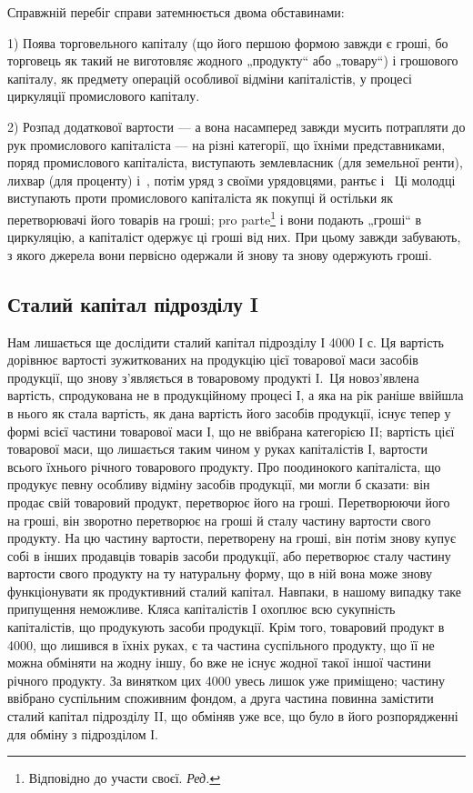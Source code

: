 
Справжній перебіг справи затемнюється двома обставинами:

1) Поява торговельного капіталу (що його першою формою
завжди є гроші, бо торговець як такий не виготовляє жодного
„продукту“ або „товару“) і грошового капіталу, як предмету
операцій особливої відміни капіталістів, у процесі циркуляції промислового
капіталу.

2) Розпад додаткової вартости — а вона насамперед завжди мусить
потрапляти до рук промислового капіталіста — на різні категорії, що їхніми
представниками, поряд промислового капіталіста, виступають землевласник
(для земельної ренти), лихвар (для проценту) і~, потім уряд з своїми
урядовцями, рантьє і~ Ці молодці виступають проти промислового
капіталіста як покупці й остільки як перетворювачі його товарів на гроші;
pro parte\footnote*{
Відповідно до участи своєї. \emph{Ред.}
} і вони подають „гроші“ в циркуляцію, а капіталіст одержує
ці гроші від них. При цьому завжди забувають, з якого джерела вони
первісно одержали й знову та знову одержують гроші.
\label{original-325-1}

\subsection[Сталий капітал підрозділу I]{Сталий капітал підрозділу I\footnotemark{}}

\label{original-325-2}
\noindent{}Нам лишається ще дослідити сталий капітал підрозділу І \deq{} 4000 І с.
Ця вартість дорівнює вартості зужиткованих на продукцію цієї товарової
маси засобів продукції, що знову з’являється в товаровому продукті І.~Ця новоз’явлена вартість, спродукована не в продукційному процесі І, а
яка на рік раніше ввійшла в нього як стала вартість, як дана вартість
його засобів продукції, існує тепер у формі всієї частини товарової маси І,
що не ввібрана категорією II; вартість цієї товарової маси, що лишається
таким чином у руках капіталістів І, \deq{}  вартости всього їхнього річного
товарового продукту. Про поодинокого капіталіста, що продукує певну
особливу відміну засобів продукції, ми могли б сказати: він продає свій
товаровий продукт, перетворює його на гроші. Перетворюючи його на
гроші, він зворотно перетворює на гроші й сталу частину вартости свого
продукту. На цю частину вартости, перетворену на гроші, він потім знову
купує собі в інших продавців товарів засоби продукції, або перетворює
сталу частину вартости свого продукту на ту натуральну форму, що
в ній вона може знову функціонувати як продуктивний сталий капітал.
Навпаки, в нашому випадку таке припущення неможливе. Кляса капіталістів
І охоплює всю сукупність капіталістів, що продукують засоби продукції.
Крім того, товаровий продукт в 4000, що лишився в їхніх руках,
є та частина суспільного продукту, що її не можна обміняти на жодну
іншу, бо вже не існує жодної такої іншої частини річного продукту. За
винятком цих 4000 увесь лишок уже приміщено; частину ввібрано суспільним
споживним фондом, а друга частина повинна замістити сталий
капітал підрозділу II, що обміняв уже все, що було в його розпорядженні
для обміну з підрозділом І.
\parbreak{}  %
